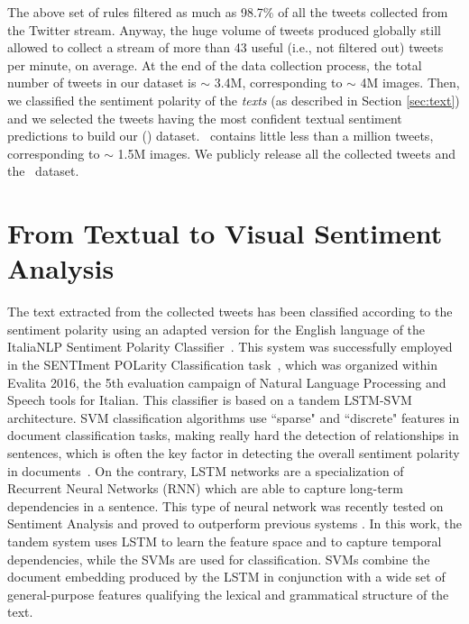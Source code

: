 The above set of rules filtered as much as 98.7\% of all the tweets collected from the Twitter stream. Anyway, the huge volume of tweets produced globally still allowed to collect a stream of more than 43 useful (i.e., not filtered out) tweets per minute, on average. At the end of the data collection process, the total number of tweets in our dataset %
is $\sim$ 3.4M, corresponding to $\sim$ 4M images. Then, we classified the sentiment polarity of the \textit{texts} (as described in Section \ref{sec:text}) and we selected the tweets having the most confident textual sentiment predictions to build our \textit{\NomeTSA} (\TSA) dataset. \TSA\, contains %
little less than a million tweets, corresponding to $\sim$ 1.5M images.
We publicly release {all the collected tweets} and the \TSA\, dataset.%


\section{From Textual to Visual Sentiment Analysis}
\label{sec:vsa:method}
The text extracted from the collected tweets has been classified according to the sentiment polarity using an adapted version for the English language of the ItaliaNLP Sentiment Polarity Classifier~\cite{CiminoD16a}.
This system was successfully employed in the SENTIment POLarity Classification task~\cite{barbieri2016overview}, which was organized within Evalita 2016, the 5th evaluation campaign of Natural Language Processing and Speech tools for Italian.
This classifier is based on a tandem LSTM-SVM architecture.
SVM classification algorithms use ``sparse" and ``discrete" features in document classification tasks, making really hard the detection of relationships in sentences, which is often the key factor in detecting the overall sentiment polarity in documents~\cite{tang2015document}.
On the contrary, LSTM networks are a specialization of Recurrent Neural Networks (RNN) which are able to capture long-term dependencies in a sentence. This type of neural network was recently tested on Sentiment Analysis and proved to outperform previous systems \cite{NakovRRSS16}.
In this work, the tandem system uses LSTM to  learn  the  feature  space and to  capture temporal dependencies, while the SVMs are used for classification.
SVMs combine the document embedding produced  by  the  LSTM  in conjunction with  a  wide  set of general-purpose features qualifying the lexical  and grammatical  structure  of  the text.

